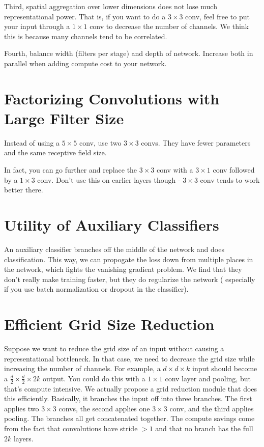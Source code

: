 \documentclass[a4paper]{article}
\begin{document}
Third, spatial aggregation over lower dimensions does not lose much
representational power. That is, if you want to do a $3 \times 3$ conv, feel
free to put your input through a $1 \times 1$ conv to decrease the number of
channels. We think this is because many channels tend to be correlated.

Fourth, balance width (filters per stage) and depth of network. Increase both
in parallel when adding compute cost to your network.

\section{Factorizing Convolutions with Large Filter Size}
Instead of using a $5 \times 5$ conv, use two $3 \times 3$ convs. They have
fewer parameters and the same receptive field size.

In fact, you can go further and replace the $3 \times 3$ conv with a
$3 \times 1$ conv followed by a $1 \times 3$ conv. Don't use this on earlier
layers though - $3 \times 3$ conv tends to work better there.

\section{Utility of Auxiliary Classifiers}
An auxiliary classifier branches off the middle of the network and does
classification. This way, we can propogate the loss down from multiple places
in the network, which fights the vanishing gradient problem. We find that they
don't really make training faster, but they do regularize the network (
especially if you use batch normalization or dropout in the classifier).

\section{Efficient Grid Size Reduction}
Suppose we want to reduce the grid size of an input without causing a
representational bottleneck. In that case, we need to decrease the grid size
while increasing the number of channels. For example, a $d \times d \times k$
input should become a $\frac{d}{2} \times \frac{d}{2} \times 2k$ output. You
could do this with a $1 \times 1$ conv layer and pooling, but that's compute
intensive. We actually propose a grid reduction module that does this
efficiently. Basically, it branches the input off into three branches. The first
applies two $3 \times 3$ convs, the second applies one $3 \times 3$ conv, and
the third applies pooling. The branches all get concatenated together.
The compute savings come from the fact that convolutions have stride $> 1$ and
that no branch has the full $2k$ layers.
\end{document}
